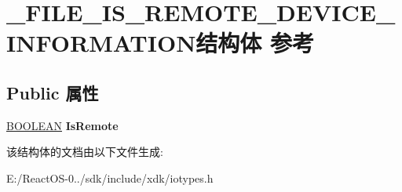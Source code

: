 \hypertarget{struct___f_i_l_e___i_s___r_e_m_o_t_e___d_e_v_i_c_e___i_n_f_o_r_m_a_t_i_o_n}{}\section{\+\_\+\+F\+I\+L\+E\+\_\+\+I\+S\+\_\+\+R\+E\+M\+O\+T\+E\+\_\+\+D\+E\+V\+I\+C\+E\+\_\+\+I\+N\+F\+O\+R\+M\+A\+T\+I\+O\+N结构体 参考}
\label{struct___f_i_l_e___i_s___r_e_m_o_t_e___d_e_v_i_c_e___i_n_f_o_r_m_a_t_i_o_n}
\subsection*{Public 属性}
\begin{DoxyCompactItemize}
\item 
\mbox{\label{struct___f_i_l_e___i_s___r_e_m_o_t_e___d_e_v_i_c_e___i_n_f_o_r_m_a_t_i_o_n_ac2faba410d9692be10ce2ef4aa4d193c}} 
\hyperlink{_processor_bind_8h_a112e3146cb38b6ee95e64d85842e380a}{B\+O\+O\+L\+E\+AN} {\bfseries Is\+Remote}
\end{DoxyCompactItemize}


该结构体的文档由以下文件生成\+:\begin{DoxyCompactItemize}
\item 
E\+:/\+React\+O\+S-\/0../sdk/include/xdk/iotypes.\+h\end{DoxyCompactItemize}
